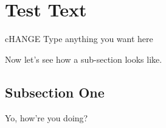 
\section{Test Text}
\label{sec:text}

cHANGE
Type anything you want here

Now let's see how a sub-section looks like.

\subsection{Subsection One}

Yo, how're you doing?



 

